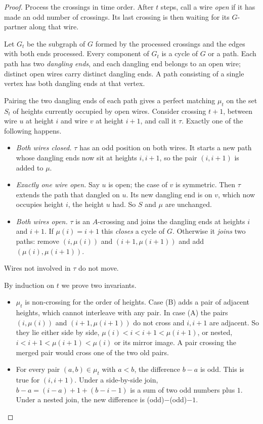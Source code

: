 \begin{proof}
Process the crossings in time order. After $t$ steps, call a wire \emph{open} if it has made an odd
number of crossings. Its last crossing is then waiting for its $G$-partner along that wire.

Let $G_t$ be the subgraph of $G$ formed by the processed crossings and the edges with both ends
processed. Every component of $G_t$ is a cycle of $G$ or a path. Each path has two \emph{dangling
ends}, and each dangling end belongs to an open wire; distinct open wires carry distinct dangling
ends. A path consisting of a single vertex has both dangling ends at that vertex.

Pairing the two dangling ends of each path gives a perfect matching $\mu_t$ on the set $S_t$ of heights
currently occupied by open wires. Consider crossing $t+1$, between wire $u$ at height $i$ and wire $v$
at height $i+1$, and call it $\tau$. Exactly one of the following happens.
\begin{itemize}
\item[(B)] \emph{Both wires closed.} $\tau$ has an odd position on both wires. It starts a new path
  whose dangling ends now sit at heights $i,i+1$, so the pair $(i,i+1)$ is added to $\mu$.
\item[(C)] \emph{Exactly one wire open.} Say $u$ is open; the case of $v$ is symmetric. Then $\tau$
  extends the path that dangled on $u$. Its new dangling end is on $v$, which now occupies height $i$,
  the height $u$ had. So $S$ and $\mu$ are unchanged.
\item[(A)] \emph{Both wires open.} $\tau$ is an $A$-crossing and joins the dangling ends at heights $i$
  and $i+1$. If $\mu(i)=i+1$ this \emph{closes} a cycle of $G$. Otherwise it \emph{joins} two paths:
  remove $(i,\mu(i))$ and $(i+1,\mu(i+1))$ and add $(\mu(i),\mu(i+1))$.
\end{itemize}
Wires not involved in $\tau$ do not move.

By induction on $t$ we prove two invariants.
\begin{itemize}
\item[(I1)] $\mu_t$ is non-crossing for the order of heights. Case (B) adds a pair of adjacent heights,
  which cannot interleave with any pair. In case (A) the pairs $(i,\mu(i))$ and $(i+1,\mu(i+1))$ do not
  cross and $i,i+1$ are adjacent. So they lie either side by side,
  $\mu(i)<i<i+1<\mu(i+1)$, or nested, $i<i+1<\mu(i+1)<\mu(i)$ or its mirror image. A pair crossing the
  merged pair would cross one of the two old pairs.
\item[(I2)] For every pair $(a,b)\in\mu_t$ with $a<b$, the difference $b-a$ is odd. This is true for
  $(i,i+1)$. Under a side-by-side join, $b-a=(i-a)+1+(b-i-1)$ is a sum of two odd numbers plus $1$.
  Under a nested join, the new difference is (odd)$-$(odd)$-1$.
\end{itemize}


\end{proof}
